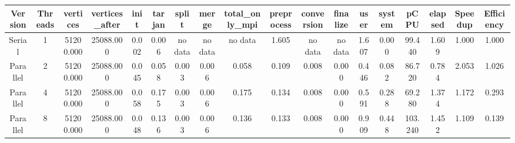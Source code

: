 \begin{tabular}{|c|c|c|c|c|c|c|c|c|c|c|c|c|c|c|c|c|c|}
\toprule
 Version &  Threads &  vertices &  vertices\_after &  init &  tarjan &   split &   merge & total\_only\_mpi &  preprocess & conversion & finalize &  user &  system &    pCPU &  elapsed &  Speedup &  Efficiency \\
\midrule
  Serial &        1 & 51200.000 &       25088.000 & 0.002 &   0.006 & no data & no data &        no data &       1.605 &    no data &  no data & 1.607 &   0.000 &  99.440 &    1.609 &    1.000 &       1.000 \\
Parallel &        2 & 51200.000 &       25088.000 & 0.045 &   0.058 &   0.003 &   0.006 &          0.058 &       0.109 &      0.008 &    0.000 & 0.446 &   0.082 &  86.720 &    0.784 &    2.053 &       1.026 \\
Parallel &        4 & 51200.000 &       25088.000 & 0.058 &   0.175 &   0.003 &   0.006 &          0.175 &       0.134 &      0.008 &    0.000 & 0.591 &   0.288 &  69.280 &    1.374 &    1.172 &       0.293 \\
Parallel &        8 & 51200.000 &       25088.000 & 0.048 &   0.136 &   0.003 &   0.006 &          0.136 &       0.133 &      0.008 &    0.000 & 0.909 &   0.448 & 103.240 &    1.452 &    1.109 &       0.139 \\
\bottomrule
\end{tabular}
